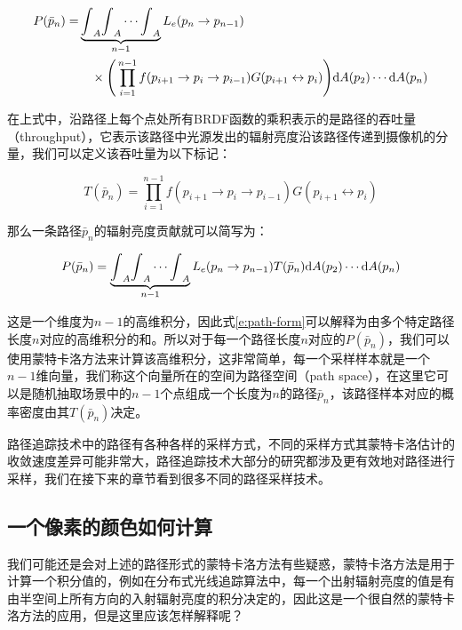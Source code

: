 \begin{equation}
	\begin{aligned}
		P(\bar{p}_n)=&\underbrace{{\rm \int}_A{\rm \int}_A \cdots{\rm \int}_A}_{n-1}L_e(p_n\to p_{n-1})\\
		&\quad\times\Bigg(\prod_{i=1}^{n-1}f(p_{i+1}\to p_i\to p_{i-1})G(p_{i+1}\leftrightarrow p_i)\Bigg) {\rm d}A(p_2)\cdots {\rm d}A(p_n)
	\end{aligned}
\end{equation}

在上式中，沿路径上每个点处所有BRDF函数的乘积表示的是路径的吞吐量（throughput），它表示该路径中光源发出的辐射亮度沿该路径传递到摄像机的分量，我们可以定义该吞吐量为以下标记：

\begin{equation}
	T(\bar{p}_n)=\prod_{i=1}^{n-1}f(p_{i+1}\to p_i\to p_{i-1})G(p_{i+1}\leftrightarrow p_i)
\end{equation}

\noindent 那么一条路径$\bar{p}_n$的辐射亮度贡献就可以简写为：

\begin{equation}
	P(\bar{p}_n)=\underbrace{{\rm \int}_A{\rm \int}_A \cdots{\rm \int}_A}_{n-1}L_e(p_n\to p_{n-1})T(\bar{p}_n) {\rm d}A(p_2)\cdots {\rm d}A(p_n)
\end{equation} 

这是一个维度为$n-1$的高维积分，因此式\ref{e:path-form}可以解释为由多个特定路径长度$n$对应的高维积分的和。所以对于每一个路径长度$n$对应的$P(\bar{p}_n)$，我们可以使用蒙特卡洛方法来计算该高维积分，这非常简单，每一个采样样本就是一个$n-1$维向量，我们称这个向量所在的空间为路径空间（path space），在这里它可以是随机抽取场景中的$n-1$个点组成一个长度为$n$的路径$\bar{p}_n$，该路径样本对应的概率密度由其$T(\bar{p}_n)$决定。

路径追踪技术中的路径有各种各样的采样方式，不同的采样方式其蒙特卡洛估计的收敛速度差异可能非常大，路径追踪技术大部分的研究都涉及更有效地对路径进行采样，我们在接下来的章节看到很多不同的路径采样技术。





\subsection{一个像素的颜色如何计算}\label{sec:pt-pixel-filter}
我们可能还是会对上述的路径形式的蒙特卡洛方法有些疑惑，蒙特卡洛方法是用于计算一个积分值的，例如在分布式光线追踪算法中，每一个出射辐射亮度的值是有由半空间上所有方向的入射辐射亮度的积分决定的，因此这是一个很自然的蒙特卡洛方法的应用，但是这里应该怎样解释呢？


